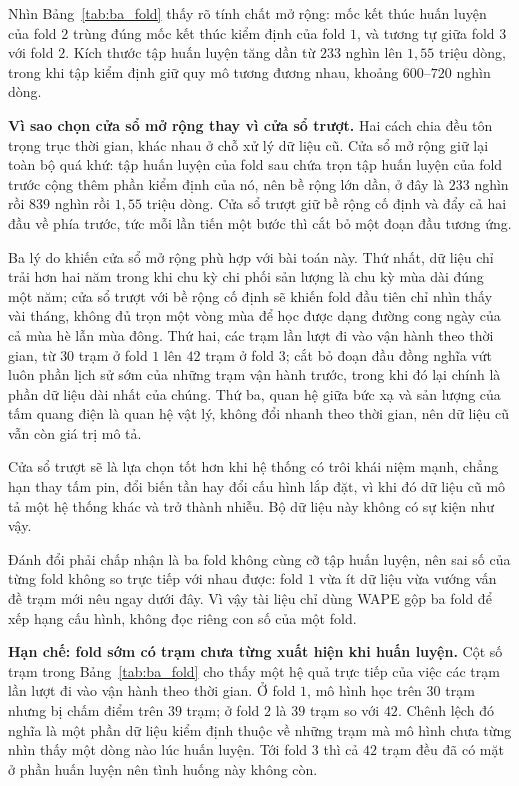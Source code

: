 Nhìn Bảng~\ref{tab:ba_fold} thấy rõ tính chất mở rộng: mốc kết thúc huấn luyện của fold
$2$ trùng đúng mốc kết thúc kiểm định của fold $1$, và tương tự giữa fold $3$ với fold
$2$. Kích thước tập huấn luyện tăng dần từ $233$ nghìn lên $1{,}55$ triệu dòng, trong
khi tập kiểm định giữ quy mô tương đương nhau, khoảng $600$--$720$ nghìn dòng.

\textbf{Vì sao chọn cửa sổ mở rộng thay vì cửa sổ trượt.} Hai cách chia đều tôn trọng
trục thời gian, khác nhau ở chỗ xử lý dữ liệu cũ. Cửa sổ mở rộng giữ lại toàn bộ quá khứ:
tập huấn luyện của fold sau chứa trọn tập huấn luyện của fold trước cộng thêm phần kiểm
định của nó, nên bề rộng lớn dần, ở đây là $233$ nghìn rồi $839$ nghìn rồi $1{,}55$ triệu
dòng. Cửa sổ trượt giữ bề rộng cố định và đẩy cả hai đầu về phía trước, tức mỗi lần tiến
một bước thì cắt bỏ một đoạn đầu tương ứng.

Ba lý do khiến cửa sổ mở rộng phù hợp với bài toán này. Thứ nhất, dữ liệu chỉ trải hơn
hai năm trong khi chu kỳ chi phối sản lượng là chu kỳ mùa dài đúng một năm; cửa sổ trượt
với bề rộng cố định sẽ khiến fold đầu tiên chỉ nhìn thấy vài tháng, không đủ trọn một
vòng mùa để học được dạng đường cong ngày của cả mùa hè lẫn mùa đông. Thứ hai, các trạm
lần lượt đi vào vận hành theo thời gian, từ $30$ trạm ở fold $1$ lên $42$ trạm ở fold $3$;
cắt bỏ đoạn đầu đồng nghĩa vứt luôn phần lịch sử sớm của những trạm vận hành trước, trong
khi đó lại chính là phần dữ liệu dài nhất của chúng. Thứ ba, quan hệ giữa bức xạ và sản
lượng của tấm quang điện là quan hệ vật lý, không đổi nhanh theo thời gian, nên dữ liệu
cũ vẫn còn giá trị mô tả.

Cửa sổ trượt sẽ là lựa chọn tốt hơn khi hệ thống có trôi khái niệm mạnh, chẳng hạn thay
tấm pin, đổi biến tần hay đổi cấu hình lắp đặt, vì khi đó dữ liệu cũ mô tả một hệ thống
khác và trở thành nhiễu. Bộ dữ liệu này không có sự kiện như vậy.

Đánh đổi phải chấp nhận là ba fold không cùng cỡ tập huấn luyện, nên sai số của từng fold
không so trực tiếp với nhau được: fold $1$ vừa ít dữ liệu vừa vướng vấn đề trạm mới nêu
ngay dưới đây. Vì vậy tài liệu chỉ dùng WAPE gộp ba fold để xếp hạng cấu hình, không đọc
riêng con số của một fold.

\textbf{Hạn chế: fold sớm có trạm chưa từng xuất hiện khi huấn luyện.} Cột số trạm trong
Bảng~\ref{tab:ba_fold} cho thấy một hệ quả trực tiếp của việc các trạm lần lượt đi vào vận
hành theo thời gian. Ở fold $1$, mô hình học trên $30$ trạm nhưng bị chấm điểm trên $39$
trạm; ở fold $2$ là $39$ trạm so với $42$. Chênh lệch đó nghĩa là một phần dữ liệu kiểm định
thuộc về những trạm mà mô hình chưa từng nhìn thấy một dòng nào lúc huấn luyện. Tới
fold $3$ thì cả $42$ trạm đều đã có mặt ở phần huấn luyện nên tình huống này không còn.

